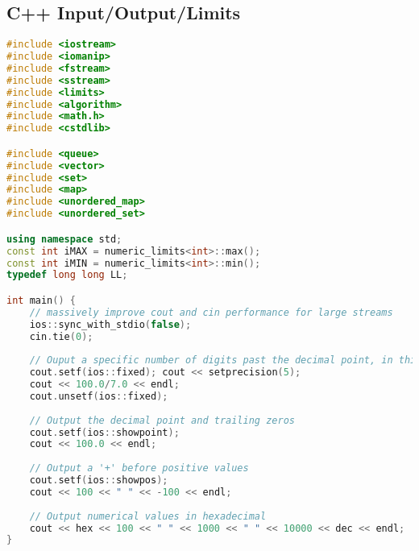 \subsection{C++ Input/Output/Limits}
\begin{lstlisting}[language=C++]
#include <iostream>
#include <iomanip>
#include <fstream>
#include <sstream>
#include <limits>
#include <algorithm>
#include <math.h>
#include <cstdlib>

#include <queue>
#include <vector>
#include <set>
#include <map>
#include <unordered_map>
#include <unordered_set>

using namespace std;
const int iMAX = numeric_limits<int>::max();
const int iMIN = numeric_limits<int>::min();
typedef long long LL;

int main() {
	// massively improve cout and cin performance for large streams
	ios::sync_with_stdio(false);
	cin.tie(0);
	
	// Ouput a specific number of digits past the decimal point, in this case 5    
	cout.setf(ios::fixed); cout << setprecision(5);
	cout << 100.0/7.0 << endl;
	cout.unsetf(ios::fixed);
    
	// Output the decimal point and trailing zeros
	cout.setf(ios::showpoint);
	cout << 100.0 << endl;
    
	// Output a '+' before positive values
	cout.setf(ios::showpos);
	cout << 100 << " " << -100 << endl;
    
	// Output numerical values in hexadecimal
	cout << hex << 100 << " " << 1000 << " " << 10000 << dec << endl;
}
\end{lstlisting}